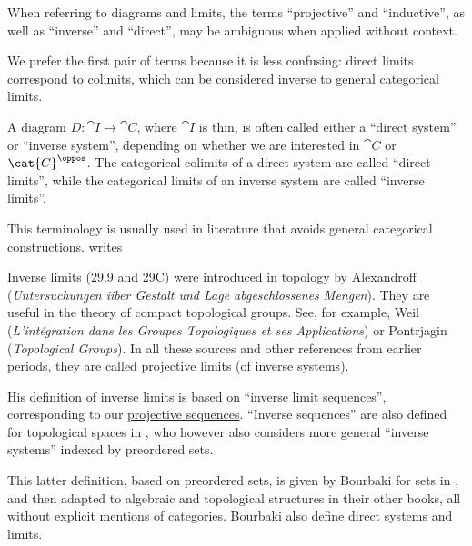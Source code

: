 \begin{remark}\label{rem:direct_and_inverse_limit_terminology}
  When referring to diagrams and limits, the terms \enquote{projective} and \enquote{inductive}, as well as \enquote{inverse} and \enquote{direct}, may be ambiguous when applied without context.

  We prefer the first pair of terms because it is less confusing: direct limits correspond to colimits, which can be considered inverse to general categorical limits.

  \begin{thmenum}
     A diagram \( D: \cat{I} \to \cat{C} \), where \( \cat{I} \) is thin, is often called either a \enquote{direct system} or \enquote{inverse system}, depending on whether we are interested in \( \cat{C} \) or \( \cat{C}^{\oppos} \). The categorical colimits of a direct system are called \enquote{direct limits}, while the categorical limits of an inverse system are called \enquote{inverse limits}.

    This terminology is usually used in literature that avoids general categorical constructions. \Textcite[315]{Willard2004GeneralTopology} writes
    \begin{displayquote}
      Inverse limits (29.9 and 29C) were introduced in topology by Alexandroff (\textit{Untersuchungen iiber Gestalt und Lage abgeschlossenes Mengen}). They are useful in the theory of compact topological groups. See, for example, Weil (\textit{L’intégration dans les Groupes Topologiques et ses Applications}) or Pontrjagin (\textit{Topological Groups}). In all these sources and other references from earlier periods, they are called projective limits (of inverse systems).
    \end{displayquote}

    His definition of inverse limits is based on \enquote{inverse limit sequences}, corresponding to our \hyperref[def:projective_sequence]{projective sequences}. \enquote{Inverse sequences} are also defined for topological spaces in \cite[98]{Engelking1989GeneralTopology}, who however also considers more general \enquote{inverse systems} indexed by preordered sets.

    This latter definition, based on preordered sets, is given by Bourbaki for sets in \cite[\S III.7]{Bourbaki2004TheoryOfSets}, and then adapted to algebraic and topological structures in their other books, all without explicit mentions of categories. Bourbaki also define direct systems and limits.


\end{thmenum}
\end{remark}
